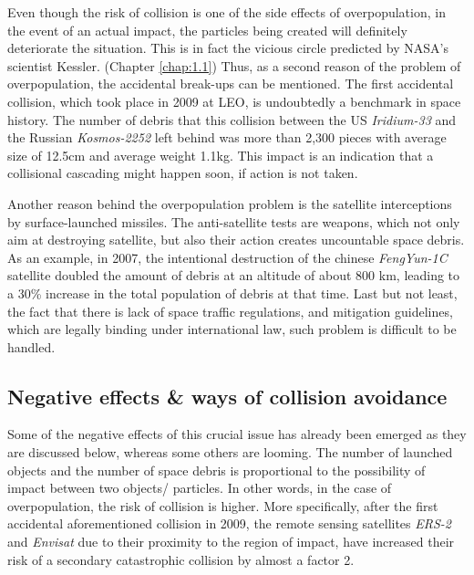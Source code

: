 Even though the risk of collision is one of the side effects of overpopulation, in the event of an actual impact, the particles being created will definitely deteriorate the situation. This is in fact the vicious circle predicted by NASA's scientist Kessler. (Chapter \ref{chap:1.1}) Thus, as a second reason of the problem of overpopulation, the accidental break-ups can be mentioned. The first accidental collision, which took place in 2009 at LEO, is undoubtedly a benchmark in space history. The number of debris that this collision between the US \textit{Iridium-33} and the Russian \textit{Kosmos-2252} left behind was more than 2,300 pieces with average size of 12.5cm and average weight 1.1kg. \cite{Kelso 2009} This impact is an indication that a collisional cascading might happen soon, if action is not taken.

Another reason behind the overpopulation problem is the satellite interceptions by surface-launched missiles. The anti-satellite tests are weapons, which not only aim at destroying satellite, but also their action creates uncountable space debris. As an example, in 2007, the intentional destruction of the chinese \textit{FengYun-1C} satellite doubled the amount of debris at an altitude of about 800 km, leading to a 30\% increase in the total population of debris at that time. \cite{Anti-satellite} Last but not least, the fact that there is lack of space traffic regulations, and mitigation guidelines, which are legally binding under international law, such problem is difficult to be handled.

\bigskip
\subsection{Negative effects \& ways of collision avoidance}
\bigskip

Some of the negative effects of this crucial issue has already been emerged as they are discussed below, whereas some others are looming. The number of launched objects and the number of space debris is proportional to the possibility of impact between two objects/ particles. In other words, in the case of overpopulation, the risk of collision is higher. More specifically, after the first accidental aforementioned collision in 2009, the remote sensing satellites \textit{ERS-2} and \textit{Envisat} due to their proximity to the region of impact, have increased their risk of a secondary catastrophic collision by almost a factor 2. \cite{Klinkrad 2009}

